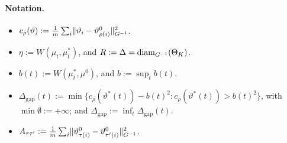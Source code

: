 \paragraph{Notation.}
\begin{itemize}
  \item $c_\rho(\vartheta) := \frac1m\sum_i\lVert \vartheta_i - \vartheta^0_{\rho(i)}\rVert^2_{G^{-1}}$.
  \item $\eta := W(\mu_t,\mu^*_t)$, and $R := \Delta = \operatorname{diam}_{G^{-1}}(\Theta_K)$.
  \item $b(t) := W(\mu^*_t,\mu^0)$, and $b := \sup_t b(t)$.
  \item $\Delta_{\mathrm{gap}}(t) := \min\{c_\rho(\vartheta^*(t)) - b(t)^2 : c_\rho(\vartheta^*(t)) > b(t)^2\}$, with
    $\min\emptyset := +\infty$; and $\Delta_{\mathrm{gap}} := \inf_t \Delta_{\mathrm{gap}}(t)$.
  \item $A_{\tau\tau'} := \frac1m\sum_i\lVert \vartheta^0_{\tau(i)} - \vartheta^0_{\tau'(i)}\rVert^2_{G^{-1}}$.
\end{itemize}

